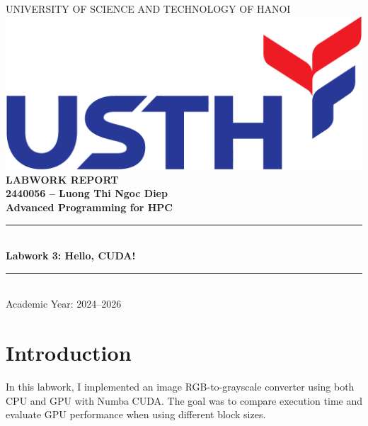 \documentclass[hidelinks,12pt,a4paper]{article}
\begin{document}

\begin{titlepage}

    \begin{center}
        {\large\uppercase{University of Science and Technology of Hanoi}} \\[1.5cm]
        \includegraphics[width=0.6\linewidth]{images/usth.png} \\[1cm]
        {\huge \bfseries \uppercase{Labwork Report}} \\[1cm]
        {\large \bfseries 2440056 -- Luong Thi Ngoc Diep} \\[0.5cm]
        {\huge \bfseries {Advanced Programming for HPC}} \\[1cm]
        \rule{\linewidth}{0.3mm} \\[0.4cm]
        {\Huge \bfseries \color{blue} Labwork 3: Hello, CUDA!} \\
        \rule{\linewidth}{0.3mm} \\[0.7cm]
        \large Academic Year: 2024--2026
    \end{center}
\end{titlepage}

\clearpage
{}

\section{Introduction}
In this labwork, I implemented an image RGB-to-grayscale converter using both CPU and GPU with Numba CUDA.  
The goal was to compare execution time and evaluate GPU performance when using different block sizes.
\end{document}
